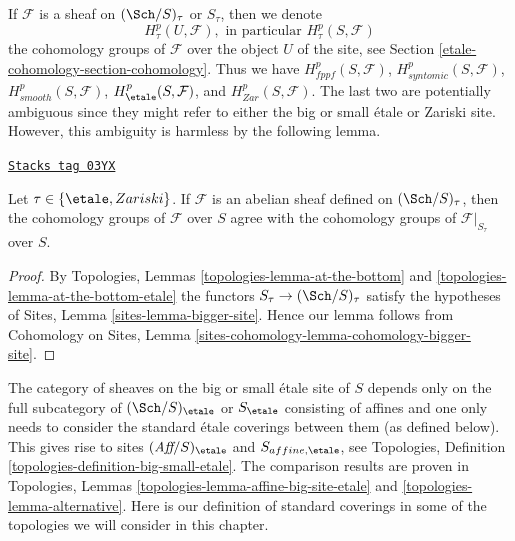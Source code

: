 \medskip\noindent
If $\mathcal{F}$ is a sheaf on $(\Sch/S)_\tau$ or $S_\tau$, then
we denote
$$
H^p_\tau(U, \mathcal{F}), \text{ in particular }
H^p_\tau(S, \mathcal{F})
$$
the cohomology groups of $\mathcal{F}$ over the object $U$ of the site, see
Section \ref{etale-cohomology-section-cohomology}. Thus we have
$H^p_{fppf}(S, \mathcal{F})$,
$H^p_{syntomic}(S, \mathcal{F})$,
$H^p_{smooth}(S, \mathcal{F})$,
$H^p_\etale(S, \mathcal{F})$, and
$H^p_{Zar}(S, \mathcal{F})$. The last two are potentially ambiguous since
they might refer to either the big or small \'etale or Zariski site. However,
this ambiguity is harmless by the following lemma.

\begin{lemma}
\label{etale-cohomology-lemma-compare-cohomology-big-small}
\href{https://stacks.math.columbia.edu/tag/03YX}{\texttt{Stacks tag 03YX}}

Let $\tau \in \{\etale, Zariski\}$.
If $\mathcal{F}$ is an abelian sheaf defined on
$(\Sch/S)_\tau$, then
the cohomology groups of $\mathcal{F}$ over $S$ agree with the cohomology
groups of $\mathcal{F}|_{S_\tau}$ over $S$.
\end{lemma}

\begin{proof}
By
Topologies, Lemmas \ref{topologies-lemma-at-the-bottom} and
\ref{topologies-lemma-at-the-bottom-etale}
the functors $S_\tau \to (\Sch/S)_\tau$
satisfy the hypotheses of
Sites, Lemma \ref{sites-lemma-bigger-site}.
Hence our lemma follows from
Cohomology on Sites, Lemma \ref{sites-cohomology-lemma-cohomology-bigger-site}.
\end{proof}

The category of sheaves on the big or small \'etale site of $S$ depends only
on the full subcategory of $(\Sch/S)_\etale$ or $S_\etale$ consisting of
affines and one only needs to consider the standard \'etale coverings between
them (as defined below). This gives rise to sites
$(\textit{Aff}/S)_\etale$ and $S_{affine, \etale}$, see
Topologies, Definition \ref{topologies-definition-big-small-etale}.
The comparison results are proven in Topologies,
Lemmas \ref{topologies-lemma-affine-big-site-etale} and
\ref{topologies-lemma-alternative}. Here is our definition of
standard coverings in some of the topologies we will consider in this chapter.

